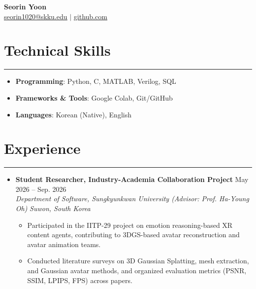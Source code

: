 \documentclass[letterpaper, 10pt]{article}
\begin{document}
 
\begin{center} 
    \textbf{\LARGE Seorin Yoon} \\ \vspace{2pt} 
    \href{mailto:seorin1020@skku.edu}{\underline{seorin1020@skku.edu}} $|$ 
    \href{https://github.com/seorin1020}{\underline{github.com}} 
\end{center} 
\section*{Technical Skills} 
\hrule 
\vspace{4pt} 
\begin{itemize} 
    \item[] \textbf{Programming}: Python, C, MATLAB, Verilog, SQL %
    \item[] \textbf{Frameworks \& Tools}: Google Colab, Git/GitHub %
    \item[] \textbf{Languages}: Korean (Native), English  %
\end{itemize} 
\section*{Experience} 
\hrule 
\vspace{4pt} 
\begin{itemize} 
    \item[] 
        \textbf{Student Researcher, Industry-Academia Collaboration Project} \hfill May 2026 -- Sep. 2026 \\ %
        \textit{Department of Software, Sungkyunkwan University (Advisor: Prof. Ha-Young Oh)} \hfill \textit{Suwon, South Korea} 
        \begin{itemize} 
            \item Participated in the IITP-29 project on emotion reasoning-based XR content agents, contributing to 3DGS-based avatar reconstruction and avatar animation teams. 
            \item Conducted literature surveys on 3D Gaussian Splatting, mesh extraction, and Gaussian avatar methods, and organized evaluation metrics (PSNR, SSIM, LPIPS, FPS) across papers. 
        \end{itemize} 
\end{itemize} 
\end{document}
